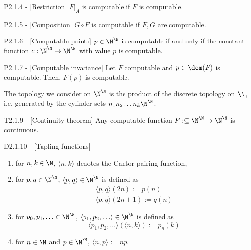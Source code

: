 \documentclass[12pt]{article}
\begin{document}
\begin{flexilemma}{P2.1.4 - }[Restriction]
    $F|_A$ is computable if $F$ is computable.
\end{flexilemma}

\begin{flexilemma}{P2.1.5 - }[Composition]
    $G \circ F$ is computable if $F,G$ are computable.
\end{flexilemma}

\begin{flexilemma}{P2.1.6 - }[Computable points]
    $p \in \N^\N$ is computable if and only if the constant function $c: \N^\N \to \N^\N$ with value $p$ is computable.
\end{flexilemma}

\begin{flexilemma}{P2.1.7 - }[Computable invariance]
    Let $F$ computable and $p \in \dom(F)$ is computable. Then, $F(p)$ is computable.
\end{flexilemma}

The topology we consider on $\N^\N$ is the product of the discrete topology on $\N$, i.e. generated by the cylinder sets $n_1n_2\ldots n_k \N^\N$.
\begin{flexitheorem}{T2.1.9 - }[Continuity theorem]
    Any computable function $F : \subseteq \N^\N \to \N^\N$ is continuous.
\end{flexitheorem}

\begin{flexidefinition}{D2.1.10 - }[Tupling functions]
    \begin{enumerate}[label = (\roman*)]
        \item for $n,k \in \N$, $\langle n,k \rangle$ denotes the Cantor pairing function,
        \item for $p,q \in \N^\N$, $\langle p,q \rangle \in \N^\N$ is defined as 
        \begin{align*}
            \langle p,q \rangle(2n) := p(n)\\
            \langle p,q \rangle(2n+1) := q(n)
        \end{align*}
        \item for $p_0,p_1,\ldots \in \N^\N$, $\langle p_1,p_2,\ldots \rangle \in \N^\N$ is defined as 
        \[ \langle p_1,p_2,\ldots \rangle (\langle n,k \rangle) := p_n(k)
        \]
        \item for $n \in \N$ and $p \in \N^\N$, $\langle n,p \rangle := np$.
    \end{enumerate}
\end{flexidefinition}
\end{document}

